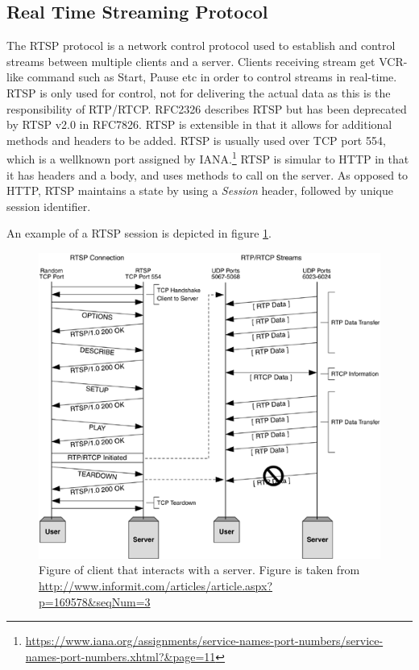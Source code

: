 \subsection{Real Time Streaming Protocol} \label{sec:design:rtsp}
The RTSP protocol is a network control protocol used to establish and control streams between multiple clients and a server. Clients receiving stream get \ac{VCR}-like command such as Start, Pause etc in order to control streams in real-time. RTSP is only used for control, not for delivering the actual data as this is the responsibility of RTP/RTCP.
RFC2326 describes RTSP but has been deprecated by RTSP v2.0 in RFC7826. RTSP is extensible in that it allows for additional methods and headers to be added.
RTSP is usually used over TCP port 554, which is a wellknown port assigned by IANA.\footnote{\url{https://www.iana.org/assignments/service-names-port-numbers/service-names-port-numbers.xhtml?&page=11}} RTSP is simular to HTTP in that it has headers and a body, and uses methods to call on the server. As opposed to HTTP, RTSP maintains a state by using a \textit{Session} header, followed by unique session identifier.

An example of a RTSP session is depicted in figure \ref{fig:design:rtsp:example}.
\begin{figure}[H]
	\centering
	\includegraphics[width=\textwidth]{figures/rtsp_example}
	\caption{Figure of client that interacts with a server. Figure is taken from \url{http://www.informit.com/articles/article.aspx?p=169578&seqNum=3}}
	\label{fig:design:rtsp:example}
\end{figure}

